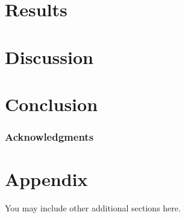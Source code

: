 \documentclass{article} %
\begin{document}
\section{Results}

\section{Discussion}

\section{Conclusion}


\subsubsection*{Acknowledgments}





\appendix
\section{Appendix}
You may include other additional sections here.
\end{document}
